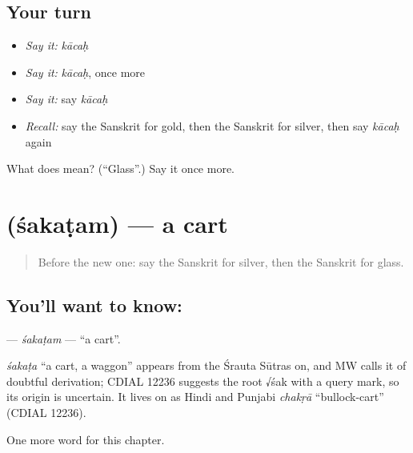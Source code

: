 \subsection*{Your turn}
\begin{itemize}
\raggedright
  \item \emph{Say it:} \emph{kācaḥ}
  \item \emph{Say it:} \emph{kācaḥ}, once more
  \item \emph{Say it:} say \emph{kācaḥ}
  \item \emph{Recall:} say the Sanskrit for gold, then the Sanskrit for silver, then say \emph{kācaḥ} again
\end{itemize}

\begin{tcolorbox}[breakable,colback=teal!4,colframe=teal!35!black,title={Before you move on}]
What does  mean? (\textquotedblleft{}Glass\textquotedblright{}.) Say it once more.
\end{tcolorbox}
\section[\texorpdfstring{\sk{शकटम्} (śakaṭam)}{शकटम् (śakaṭam)}]{ (śakaṭam) — a cart}

\label{lesson:SA-C122-sakatam}



\begin{quote}
Before the new one: say the Sanskrit for silver, then the Sanskrit for glass.
\end{quote}

\subsection*{You'll want to know: }
\textbf{} — \emph{śakaṭam} — \textquotedblleft{}a cart\textquotedblright{}.

\begin{cousinweb}
\emph{śakaṭa} \textquotedblleft{}a cart, a waggon\textquotedblright{} appears from the Śrauta Sūtras on, and MW calls it of doubtful derivation; CDIAL 12236 suggests the root √śak with a query mark, so its origin is uncertain. It lives on as Hindi and Punjabi \emph{chakṛā} \textquotedblleft{}bullock-cart\textquotedblright{} (CDIAL 12236).
\end{cousinweb}

\begin{grammarlens}[title={What you've built}]
One more word for this chapter.
\end{grammarlens}

